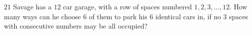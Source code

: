 $21$ Savage has a $12$ car garage, with a row of spaces numbered $1,2,3,\ldots,12$. How many ways can he choose $6$ of them to park his $6$ identical cars in, if no $3$ spaces with consecutive numbers may be all occupied?